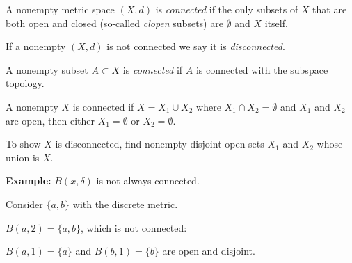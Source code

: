 \documentclass[10pt,aspectratio=169]{beamer}
\begin{document}
\begin{frame}

\begin{definition}
A nonempty
metric space $(X,d)$ is \emph{connected} if the
only subsets of $X$ that are both open and closed (so-called
\emph{clopen} subsets) are $\emptyset$ and $X$ itself.

\pause
\medskip

If a nonempty $(X,d)$ is not connected we say it is
\emph{disconnected}.

\pause
\medskip

A nonempty subset $A \subset X$ is \emph{connected} if
$A$ is connected with the subspace topology.
\end{definition}

\pause
A nonempty $X$ is connected if
$X = X_1 \cup X_2$ where $X_1 \cap X_2 = \emptyset$ and $X_1$ and $X_2$ are
open, then either $X_1 = \emptyset$ or $X_2 = \emptyset$.

\pause
\medskip

To show $X$ is disconnected, find nonempty
disjoint open sets $X_1$ and
$X_2$ whose union is $X$.

\pause
\medskip

\textbf{Example:}
$B(x,\delta)$ is not always connected.

\pause
Consider $\{ a, b\}$ with the discrete metric.

\pause
\thus \quad $B(a,2) = \{ a , b \}$, which is not
connected:

\pause
$B(a,1) = \{ a \}$ and 
$B(b,1) = \{ b \}$ are open and disjoint.

\end{frame}
\end{document}
